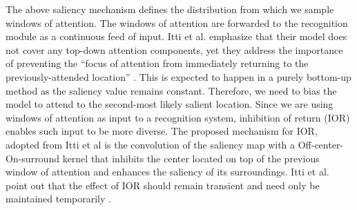 \documentclass{report}
\begin{document}
The above saliency mechanism defines the distribution from which we sample windows of attention. The windows of attention are forwarded to the recognition module as a continuous feed of input. Itti et al. emphasize that their model does not cover any top-down attention components, yet they address the importance of preventing the ``focus of attention from immediately returning to the previously-attended location'' \cite{Itti2000}. This is expected to happen in a purely bottom-up method as the saliency value remains constant. Therefore, we need to bias the model to attend to the second-most likely salient location. Since we are using windows of attention as input to a recognition system, inhibition of return (IOR) enables such input to be more diverse. The proposed mechanism for IOR, adopted from Itti et al is the convolution of the saliency map with a Off-center-On-surround kernel that inhibits the center located on top of the previous window of attention and enhances the saliency of its surroundings. Itti et al. point out that the effect of IOR should remain transient and need only be maintained temporarily \cite{Itti2000}.
\end{document}
